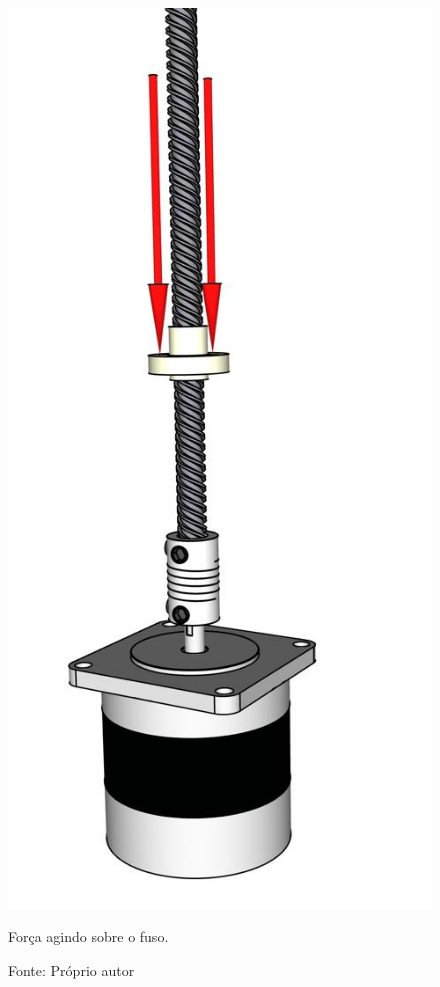 \begin{figure}[H]
\centering
\includegraphics[scale = 0.25]{figuras/esqforcafuso}
\caption{Força agindo sobre o fuso.}
\caption*{Fonte: Próprio autor}
\label{fig:esqforcafuso}
\end{figure}
    
